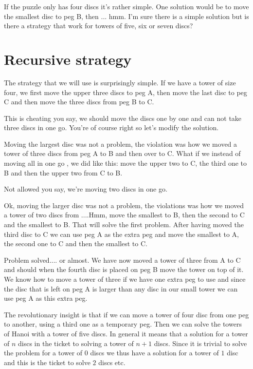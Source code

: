 \documentclass[a4paper,11pt]{article}
\begin{document}
If the puzzle only has four discs it's rather simple. One solution
would be to move the smallest disc to peg B, then ... hmm. I'm sure
there is a simple solution but is there a strategy that work for
towers of five, six or seven discs?

\section*{Recursive strategy}

The strategy that we will use is surprisingly simple. If we have a
tower of size four, we first move the upper three discs to peg A, then
move the last disc to peg C and then move the three discs from peg B
to C.

This is cheating you say, we should move the discs one by one and can
not take three discs in one go. You're of course right so let's modify
the solution.

Moving the largest disc was not a problem, the violation was how we
moved a tower of three discs from peg A to B and then over to C. What
if we instead of moving all in one go , we did like this: move the
upper two to C, the third one to B and then the upper two from C to B.

Not allowed you say, we're moving two discs in one go.

Ok, moving the larger disc was not a problem, the violations was how
we moved a tower of two discs from ....Hmm, move the smallest to B,
then the second to C and the smallest to B. That will solve the first
problem. After having moved the third disc to C we can use peg A as
the extra peg and move the smallest to A, the second one to C and then
the smallest to C.

Problem solved.... or almost. We have now moved a tower of three from
A to C and should when the fourth disc is placed on peg B move the
tower on top of it. We know how to move a tower of three if we have
one extra peg to use and since the disc that is left on peg A is
larger than any disc in our small tower we can use peg A as this
extra peg.

The revolutionary insight is that if we can move a tower of four disc
from one peg to another, using a third one as a temporary peg. Then
we can solve the towers of Hanoi with a tower of five discs. In
general it means that a solution for a tower of $n$ discs in the
ticket to solving a tower of $n+1$ discs. Since it is trivial to solve
the problem for a tower of $0$ discs we thus have a solution for a
tower of $1$ disc and this is the ticket to solve $2$ discs etc.
\end{document}

